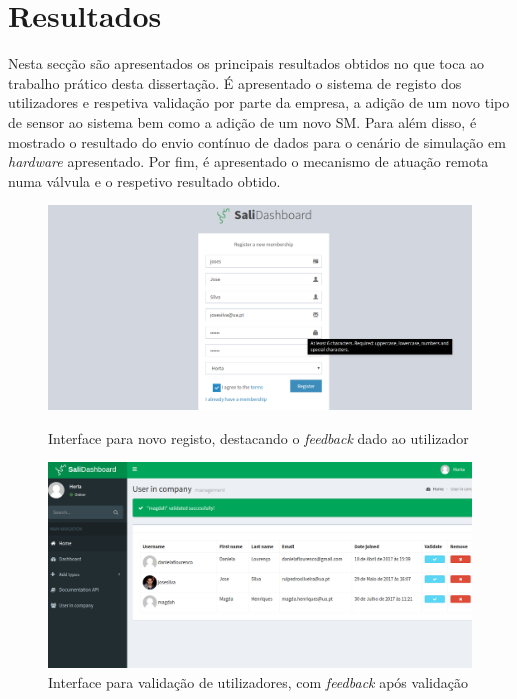 \section{Resultados}


Nesta secção são apresentados os principais resultados obtidos no que toca ao trabalho prático desta dissertação. É apresentado o sistema de registo dos utilizadores e respetiva validação por parte da empresa, a adição de um novo tipo de sensor ao sistema bem como a adição de um novo \acl{SM}. Para além disso, é mostrado o resultado do envio contínuo de dados para o cenário de simulação em \textit{hardware} apresentado. Por fim, é apresentado o mecanismo de atuação remota numa válvula e o respetivo resultado obtido. 







\newpage


\begin{figure}[h]
	\centering
	\begin{minipage}[b]{0.495\textwidth}
		\centering
		\includegraphics[width=\textwidth]{prints-web/register.png}
		\caption{Interface para novo registo, destacando o \textit{feedback} dado ao utilizador}
		\label{novouser}
	\end{minipage}
	\hfill
	\begin{minipage}[b]{0.495\textwidth}
		\centering
		\includegraphics[width=\textwidth]{prints-web/validate_company.png}
		\caption{Interface para validação de utilizadores, com \textit{feedback} após validação}
		\label{validateuser}
	\end{minipage}
\end{figure}


